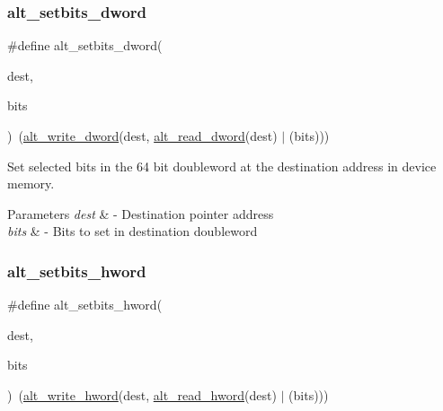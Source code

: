 \subsubsection{\texorpdfstring{alt\_setbits\_dword}{alt\_setbits\_dword}}
{\footnotesize\ttfamily \#define alt\+\_\+setbits\+\_\+dword(\begin{DoxyParamCaption}\item[{}]{dest,  }\item[{}]{bits }\end{DoxyParamCaption})~(\mbox{\hyperlink{group__ALT__SOCAL__UTIL__RW__FUNC_ga0fe80f8e5b6f3f09976dd35df49285e7}{alt\+\_\+write\+\_\+dword}}(dest, \mbox{\hyperlink{group__ALT__SOCAL__UTIL__RW__FUNC_gad66f5bf6cf73c5ba348a7ab118bcd2a0}{alt\+\_\+read\+\_\+dword}}(dest) $\vert$ (bits)))}

Set selected bits in the 64 bit doubleword at the destination address in device memory. 
\begin{DoxyParams}{Parameters}
{\em dest} & -\/ Destination pointer address \\
\hline
{\em bits} & -\/ Bits to set in destination doubleword \\
\hline
\end{DoxyParams}
\mbox{\label{group__ALT__SOCAL__UTIL__SC__FUNC_ga3cee77f851e1fc8b245ad2c550da80e2}} 
\subsubsection{\texorpdfstring{alt\_setbits\_hword}{alt\_setbits\_hword}}
{\footnotesize\ttfamily \#define alt\+\_\+setbits\+\_\+hword(\begin{DoxyParamCaption}\item[{}]{dest,  }\item[{}]{bits }\end{DoxyParamCaption})~(\mbox{\hyperlink{group__ALT__SOCAL__UTIL__RW__FUNC_ga68370263143f2bbcae44530837772f50}{alt\+\_\+write\+\_\+hword}}(dest, \mbox{\hyperlink{group__ALT__SOCAL__UTIL__RW__FUNC_gaae69946769b67a9b8bf4f57143b1c4d7}{alt\+\_\+read\+\_\+hword}}(dest) $\vert$ (bits)))}

